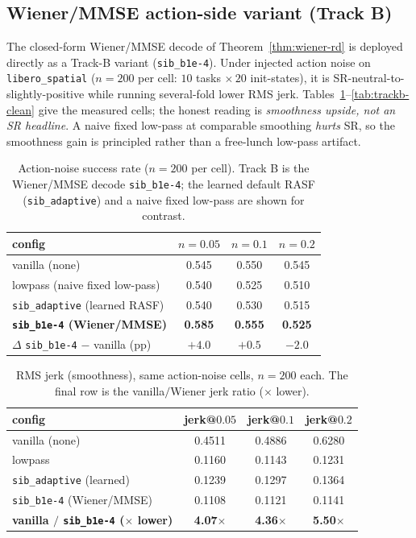 \subsection{Wiener/MMSE action-side variant (Track B)}

The closed-form Wiener/MMSE decode of Theorem~\ref{thm:wiener-rd} is deployed
directly as a Track-B variant (\texttt{sib\_b1e-4}). Under injected action noise
on \texttt{libero\_spatial} ($n=200$ per cell: $10$ tasks $\times\,20$
init-states), it is SR-neutral-to-slightly-positive while running several-fold
lower RMS jerk. Tables~\ref{tab:trackb-sr}--\ref{tab:trackb-clean} give the
measured cells; the honest reading is \emph{smoothness upside, not an SR
headline}. A naive fixed low-pass at comparable smoothing \emph{hurts} SR, so
the smoothness gain is principled rather than a free-lunch low-pass artifact.

\begin{table}[h]
\centering
\caption{Action-noise success rate ($n=200$ per cell). Track B is the
Wiener/MMSE decode \texttt{sib\_b1e-4}; the learned default RASF
(\texttt{sib\_adaptive}) and a naive fixed low-pass are shown for contrast.}
\label{tab:trackb-sr}
\begin{tabular}{lccc}
\hline
config & $n=0.05$ & $n=0.1$ & $n=0.2$ \\
\hline
vanilla (none)                       & 0.545 & 0.550 & 0.545 \\
lowpass (naive fixed low-pass)       & 0.540 & 0.525 & 0.510 \\
\texttt{sib\_adaptive} (learned RASF) & 0.540 & 0.530 & 0.515 \\
\textbf{\texttt{sib\_b1e-4} (Wiener/MMSE)} & \textbf{0.585} & \textbf{0.555} & \textbf{0.525} \\
$\Delta$ \texttt{sib\_b1e-4} $-$ vanilla (pp) & $+4.0$ & $+0.5$ & $-2.0$ \\
\hline
\end{tabular}
\end{table}

\begin{table}[h]
\centering
\caption{RMS jerk (smoothness), same action-noise cells, $n=200$ each. The final
row is the vanilla$/$Wiener jerk ratio ($\times$ lower).}
\label{tab:trackb-jerk}
\begin{tabular}{lccc}
\hline
config & jerk@$0.05$ & jerk@$0.1$ & jerk@$0.2$ \\
\hline
vanilla (none)                & 0.4511 & 0.4886 & 0.6280 \\
lowpass                       & 0.1160 & 0.1143 & 0.1231 \\
\texttt{sib\_adaptive} (learned) & 0.1239 & 0.1297 & 0.1364 \\
\texttt{sib\_b1e-4} (Wiener/MMSE) & 0.1108 & 0.1121 & 0.1141 \\
\textbf{vanilla $/$ \texttt{sib\_b1e-4} ($\times$ lower)} & \textbf{4.07$\times$} & \textbf{4.36$\times$} & \textbf{5.50$\times$} \\
\hline
\end{tabular}
\end{table}

